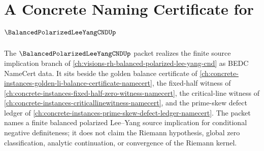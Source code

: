 \chapter{A Concrete Naming Certificate for $\BalancedPolarizedLeeYangCNDUp$}
\label{ch:concrete-instances-balanced-polarized-lee-yang-cnd-namecert}

The $\BalancedPolarizedLeeYangCNDUp$ packet realizes the finite source implication branch of \autoref{ch:visions-rh-balanced-polarized-lee-yang-cnd} as BEDC NameCert data. It sits beside the golden balance certificate of \autoref{ch:concrete-instances-golden-li-balance-certificate-namecert}, the fixed-half witness of \autoref{ch:concrete-instances-fixed-half-zero-witness-namecert}, the critical-line witness of \autoref{ch:concrete-instances-criticallinewitness-namecert}, and the prime-skew defect ledger of \autoref{ch:concrete-instances-prime-skew-defect-ledger-namecert}. The packet names a finite balanced polarized Lee--Yang source implication for conditional negative definiteness; it does not claim the Riemann hypothesis, global zero classification, analytic continuation, or convergence of the Riemann kernel.

